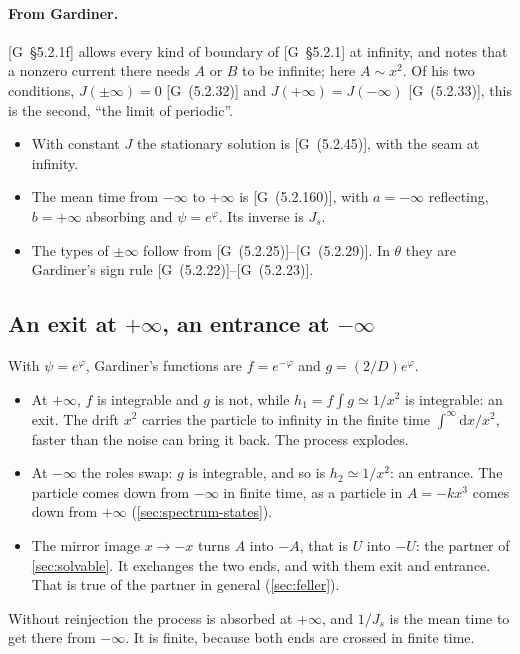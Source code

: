 \documentclass[11pt]{article}
\numberwithin{equation}{section}
\newcommand{\dd}{\mathrm{d}}
\newcommand{\G}[1]{[G~(#1)]}
\newcommand{\Gs}[1]{[G~\S#1]}
\begin{document}
\paragraph{From Gardiner.} \Gs{5.2.1f} allows every kind of boundary of \Gs{5.2.1} at infinity, and notes that a
nonzero current there needs $A$ or $B$ to be infinite; here $A\sim x^2$. Of his two conditions, $J(\pm\infty)=0$
\G{5.2.32} and $J(+\infty)=J(-\infty)$ \G{5.2.33}, this is the second, ``the limit of periodic''.
\begin{itemize}
  \item With constant $J$ the stationary solution is \G{5.2.45}, with the seam at infinity.
  \item The mean time from $-\infty$ to $+\infty$ is \G{5.2.160}, with $a=-\infty$ reflecting, $b=+\infty$ absorbing
        and $\psi=e^\varphi$. Its inverse is $J_s$.
  \item The types of $\pm\infty$ follow from \G{5.2.25}--\G{5.2.29}. In $\theta$ they are Gardiner's sign rule
        \G{5.2.22}--\G{5.2.23}.
\end{itemize}

\subsection{An exit at \texorpdfstring{$+\infty$}{+infinity}, an entrance at \texorpdfstring{$-\infty$}{-infinity}}

With $\psi=e^\varphi$, Gardiner's functions are $f=e^{-\varphi}$ and $g=(2/D)e^{\varphi}$.
\begin{itemize}
  \item At $+\infty$, $f$ is integrable and $g$ is not, while $h_1=f\int g\simeq1/x^2$ is integrable: an exit. The
        drift $x^2$ carries the particle to infinity in the finite time $\int^\infty\dd x/x^2$, faster than the noise
        can bring it back. The process explodes.
  \item At $-\infty$ the roles swap: $g$ is integrable, and so is $h_2\simeq1/x^2$: an entrance. The particle comes
        down from $-\infty$ in finite time, as a particle in $A=-kx^3$ comes down from $+\infty$
        (\cref{sec:spectrum-states}).
  \item The mirror image $x\to-x$ turns $A$ into $-A$, that is $U$ into $-U$: the partner of \cref{sec:solvable}.
        It exchanges the two ends, and with them exit and entrance. That is true of the partner in general
        (\cref{sec:feller}).
\end{itemize}
Without reinjection the process is absorbed at $+\infty$, and $1/J_s$ is the mean time to get there from $-\infty$. It
is finite, because both ends are crossed in finite time.
\end{document}
